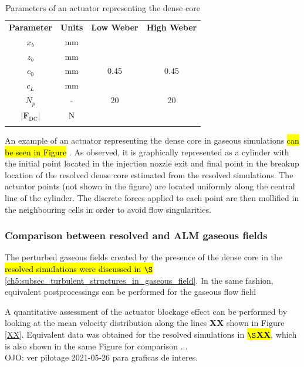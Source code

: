 \begin{table}[!h]
\centering
\caption{Parameters of an actuator representing the dense core}
\begin{tabular}{cccc}
\thickhline
\textbf{Parameter} & \textbf{Units} & \textbf{Low Weber} &  \textbf{High Weber} \\
\thickhline
$x_b$ & mm & & \\
$z_b$ & mm & & \\
$c_0$ & mm & 0.45 & 0.45 \\
$c_L$ & mm & & \\
$N_p$ & - & 20 & 20 \\
$| \textbf{F}_\mathrm{DC} |$ & N &  & \\
\thickhline
\end{tabular}
\label{tab:jicf_lgs_ALM_parameters}
\end{table}

An example of an actuator representing the dense core in gaseous simulations \hl{can be seen in Figure }. As observed, it is graphically represented as a cylinder with the initial point located in the injection nozzle exit and final point in the breakup location of the resolved dense core estimated from the resolved simulations. The actuator points (not shown in the figure) are located uniformly along the central line of the cylinder. The discrete forces applied to each point are then mollified in the neighbouring cells in order to avoid flow singularities.

\subsubsection{Comparison between resolved and ALM gaseous fields}

The perturbed gaseous fields created by the presence of the dense core in the \hl{resolved simulations were discussed in $\S$}\ref{ch5:subsec_turbulent_structures_in_gaseous_field}. In the same fashion, equivalent postprocessings can be performed for the gaseous flow field 

A quantitative assessment of the actuator blockage effect can be performed by looking at the mean velocity distribution along the lines \textbf{XX} shown in Figure \ref{XX}. Equivalent data was obtained for the resolved simulations in \hl{\textbf{$\S$XX}}, which is also shown in the same Figure for comparison ... \\

OJO: ver pilotage 2021-05-26 para graficas de interes.

